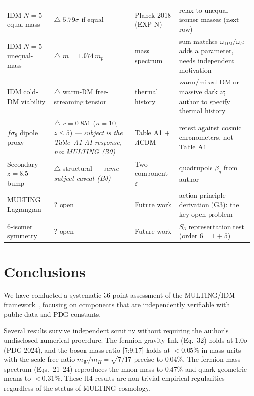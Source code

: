 \documentclass[twocolumn,prd,amsmath,amssymb,floatfix]{revtex4-2}
\begin{document}
\begin{table}[tb]
\begin{ruledtabular}
\begin{tabular}{p{2.7cm} p{4.2cm} p{2.1cm} p{4.9cm}}
IDM $N=5$ equal-mass & $\triangle$ $5.79\sigma$ if equal & Planck 2018 (EXP-N) & relax to unequal isomer masses (next row) \\
IDM $N=5$ unequal-mass & $\triangle$ $\bar{m}=1.074\,m_p$ & mass spectrum & sum matches $\omega_\mathrm{DM}/\omega_b$; adds a parameter, needs independent motivation \\
IDM cold-DM viability & $\triangle$ warm-DM free-streaming tension & thermal history & warm/mixed-DM or massive dark $\nu$; author to specify thermal history \\
$f\sigma_8$ dipole proxy & $\triangle$ $r{=}0.851$ ($n{=}10$, $z{\le}5$) --- \emph{subject is the Table~A1 AI response, not MULTING (B0)} & Table A1 $+$ $\Lambda$CDM & retest against cosmic chronometers, not Table A1 \\
Secondary $z{=}8.5$ bump & $\triangle$ structural --- \emph{same subject caveat (B0)} & Two-component $\varepsilon$ & quadrupole $\beta_q$ from author \\
MULTING Lagrangian & ? open & Future work & action-principle derivation (G3): the key open problem \\
6-isomer symmetry & ? open & Future work & $S_3$ representation test (order $6 = 1{+}5$) \\
\hline
\end{tabular}
\end{ruledtabular}
\end{table}

\section{Conclusions}
\label{sec:conclusions}

We have conducted a systematic 36-point assessment of the MULTING/IDM
framework~\cite{buckholtz2026}, focusing on components that are independently
verifiable with public data and PDG constants.

Several results survive independent scrutiny without requiring the author's
undisclosed numerical procedure.
The fermion-gravity link (Eq.~32) holds at $1.0\sigma$ (PDG 2024),
and the boson mass ratio [7:9:17] holds at $<0.05\%$ in mass units
with the scale-free ratio $m_W/m_H = \sqrt{7/17}$ precise to $0.04\%$.
The fermion mass spectrum (Eqs.~21--24) reproduces the muon mass to $0.47\%$
and quark geometric means to $<0.31\%$.
These H4 results are non-trivial empirical regularities regardless of the
status of MULTING cosmology.
\end{document}
